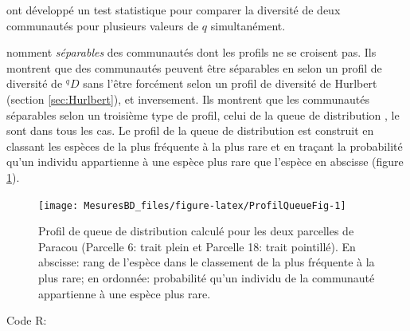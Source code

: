 \documentclass[
  11pt,
  french,
  a4paper,
  extrafontsizes,onecolumn,openright
  ]{memoir}
\begin{document}
\normalsize

\textcite{Pallmann2012} ont développé un test statistique pour comparer la diversité de deux communautés pour plusieurs valeurs de \(q\) simultanément.

\textcite{Liu2006} nomment \emph{séparables} des communautés dont les profils ne se croisent pas.
Ils montrent que des communautés peuvent être séparables en selon un profil de diversité de \(^{q}\!D\) sans l'être forcément selon un profil de diversité de Hurlbert (section \ref{sec:Hurlbert}), et inversement.
Ils montrent que les communautés séparables selon un troisième type de profil, celui de la queue de distribution \autocite{Patil1982}, le sont dans tous les cas.
Le profil de la queue de distribution est construit en classant les espèces de la plus fréquente à la plus rare et en traçant la probabilité qu'un individu appartienne à une espèce plus rare que l'espèce en abscisse (figure \ref{fig:ProfilQueueFig}).



\scriptsize

\begin{figure}

{\centering \texttt{[image: MesuresBD\_files/figure-latex/ProfilQueueFig-1]} 

}

\caption{Profil de queue de distribution calculé pour les deux parcelles de Paracou (Parcelle 6: trait plein et Parcelle 18: trait pointillé). En abscisse: rang de l'espèce dans le classement de la plus fréquente à la plus rare; en ordonnée: probabilité qu'un individu de la communauté appartienne à une espèce plus rare.}\label{fig:ProfilQueueFig}
\end{figure}

\normalsize

Code R:

\scriptsize
\end{document}
